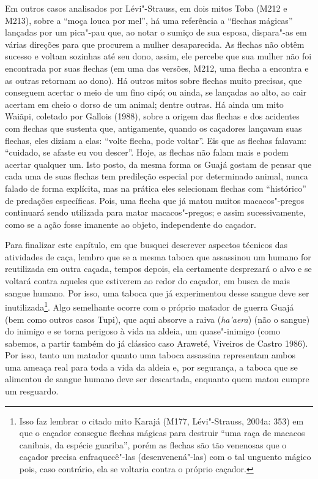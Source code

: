 Em outros casos analisados por Lévi"-Strauss, em dois mitos Toba (M212 e
M213), sobre a ``moça louca por mel'', há uma referência a ``flechas
mágicas'' lançadas por um pica"-pau que, ao notar o sumiço de sua esposa,
dispara"-as em várias direções para que procurem a mulher desaparecida.
As flechas não obtêm sucesso e voltam sozinhas até seu dono, assim, ele
percebe que sua mulher não foi encontrada por suas flechas (em uma das
versões, M212, uma flecha a encontra e as outras retornam ao dono). Há
outros mitos sobre flechas muito precisas, que conseguem acertar o meio
de um fino cipó; ou ainda, se lançadas ao alto, ao cair acertam em cheio
o dorso de um animal; dentre outras. Há ainda um mito Waiãpi, coletado
por Gallois (1988), sobre a origem das flechas e dos acidentes com
flechas que sustenta que, antigamente, quando os caçadores lançavam suas
flechas, eles diziam a elas: ``volte flecha, pode voltar''. Eis que as
flechas falavam: ``cuidado, se afaste eu vou descer''. Hoje, as flechas
não falam mais e podem acertar qualquer um. Isto posto, da mesma forma
os Guajá gostam de pensar que cada uma de suas flechas tem predileção
especial por determinado animal, nunca falado de forma explícita, mas na
prática eles selecionam flechas com ``histórico'' de predações
específicas. Pois, uma flecha que já matou muitos macacos"-pregos
continuará sendo utilizada para matar macacos"-pregos; e assim
sucessivamente, como se a ação fosse imanente ao objeto, independente do
caçador.

Para finalizar este capítulo, em que busquei descrever aspectos técnicos
das atividades de caça, lembro que se a mesma taboca que assassinou um
humano for reutilizada em outra caçada, tempos depois, ela certamente
desprezará o alvo e se voltará contra aqueles que estiverem ao redor do
caçador, em busca de mais sangue humano. Por isso, uma taboca que já
experimentou desse sangue deve ser inutilizada\footnote{Isso faz lembrar
  o citado mito Karajá (M177, Lévi"-Strauss, 2004a: 353) em que o caçador
  consegue flechas mágicas para destruir ``uma raça de macacos canibais,
  da espécie guariba'', porém as flechas são tão venenosas que o caçador
  precisa enfraquecê"-las (desenvenená"-las) com o tal unguento mágico
  pois, caso contrário, ela se voltaria contra o próprio caçador.}. Algo
semelhante ocorre com o próprio matador de guerra Guajá (bem como outros
casos Tupi), que aqui absorve a raiva (\emph{ha'aera}) (não o sangue) do
inimigo e se torna perigoso à vida na aldeia, um quase"-inimigo (como
sabemos, a partir também do já clássico caso Araweté, Viveiros de Castro
1986). Por isso, tanto um matador quanto uma taboca assassina
representam ambos uma ameaça real para toda a vida da aldeia e, por
segurança, a taboca que se alimentou de sangue humano deve ser
descartada, enquanto quem matou cumpre um resguardo.


